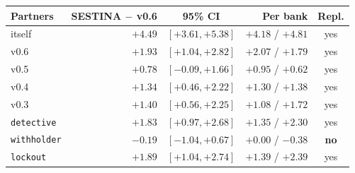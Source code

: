 \begin{tabular}{lrcrc}
\toprule
Partners & SESTINA $-$ v0.6 & 95\% CI & Per bank & Repl. \\
\midrule
itself & $+4.49$ & $[+3.61, +5.38]$ & $+4.18$ / $+4.81$ & yes \\
v0.6 & $+1.93$ & $[+1.04, +2.82]$ & $+2.07$ / $+1.79$ & yes \\
v0.5 & $+0.78$ & $[-0.09, +1.66]$ & $+0.95$ / $+0.62$ & yes \\
v0.4 & $+1.34$ & $[+0.46, +2.22]$ & $+1.30$ / $+1.38$ & yes \\
v0.3 & $+1.40$ & $[+0.56, +2.25]$ & $+1.08$ / $+1.72$ & yes \\
\texttt{detective} & $+1.83$ & $[+0.97, +2.68]$ & $+1.35$ / $+2.30$ & yes \\
\texttt{withholder} & $-0.19$ & $[-1.04, +0.67]$ & $+0.00$ / $-0.38$ & \textbf{no} \\
\texttt{lockout} & $+1.89$ & $[+1.04, +2.74]$ & $+1.39$ / $+2.39$ & yes \\
\bottomrule
\end{tabular}
